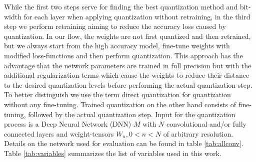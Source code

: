 While the first two steps serve for finding the best quantization method and 
bit-width for each layer when applying quantization without retraining, 
in the third step we perform retraining aiming to reduce the accuracy loss 
caused by quantization. In our flow, the weights are not first quantized and 
then retrained, but we always start from the high accuracy model, fine-tune 
weights with modified loss-functions and then perform quantization. This 
approach has the advantage that the network parameters are trained in full
precision but with the additional regularization terms which cause the weights 
to reduce their distance to the desired quantization levels before performing 
the actual quantization step. To better distinguish we use the term direct 
quantization for quantization without any fine-tuning. Trained quantization on the other hand consists of fine-tuning, followed by the actual quantization step. 
Input for the quantization process is a Deep Neural Network (DNN) $M$ with $N$ 
convolutional and/or fully connected layers and weight-tensors $W_n, 0<n<N$ of 
arbitrary resolution. Details on the network used for evaluation can be found in 
table \ref{tab:allconv}. Table \ref{tab:variables} summarizes the list of 
variables used in this work.

